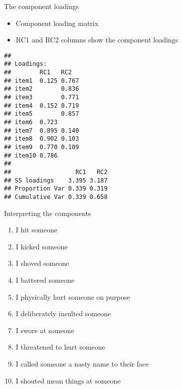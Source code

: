 \documentclass[
  ignorenonframetext,
]{beamer}
\newenvironment{Shaded}{\begin{snugshade}}{\end{snugshade}}
\newcommand{\DataTypeTok}[1]{\textcolor[rgb]{0.13,0.29,0.53}{#1}}
\newcommand{\DecValTok}[1]{\textcolor[rgb]{0.00,0.00,0.81}{#1}}
\newcommand{\KeywordTok}[1]{\textcolor[rgb]{0.13,0.29,0.53}{\textbf{#1}}}
\newcommand{\NormalTok}[1]{#1}
\newcommand{\OperatorTok}[1]{\textcolor[rgb]{0.81,0.36,0.00}{\textbf{#1}}}
\providecommand{\tightlist}{%
  \setlength{\itemsep}{0pt}\setlength{\parskip}{0pt}}
\begin{document}
\begin{frame}[fragile]{The component loadings}
\protect\hypertarget{the-component-loadings}{}

\begin{itemize}
\tightlist
\item
  Component loading matrix
\item
  RC1 and RC2 columns show the component loadings
\end{itemize}

\begin{Shaded}
\end{Shaded}

\begin{verbatim}
## 
## Loadings:
##        RC1   RC2  
## item1  0.125 0.767
## item2        0.836
## item3        0.771
## item4  0.152 0.719
## item5        0.857
## item6  0.723      
## item7  0.895 0.140
## item8  0.902 0.103
## item9  0.770 0.109
## item10 0.786      
## 
##                  RC1   RC2
## SS loadings    3.395 3.187
## Proportion Var 0.339 0.319
## Cumulative Var 0.339 0.658
\end{verbatim}

\end{frame}

\begin{frame}{Interpreting the components}
\protect\hypertarget{interpreting-the-components-1}{}

\begin{enumerate}
\tightlist
\item
  I hit someone
\item
  I kicked someone
\item
  I shoved someone
\item
  I battered someone
\item
  I physically hurt someone on purpose
\item
  I deliberately insulted someone
\item
  I swore at someone
\item
  I threatened to hurt someone
\item
  I called someone a nasty name to their face
\item
  I shouted mean things at someone
\end{enumerate}

\end{frame}
\end{document}
